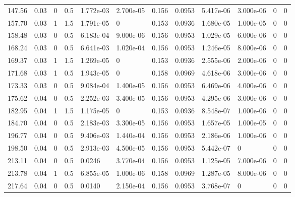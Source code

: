 \documentclass[preview]{standalone}
\begin{document}
{{\begin{tabular}{L{1.2cm}C{1.2cm} C{0.3cm}C{0.5cm} C{1.4cm}C{1.4cm} C{1.4cm}C{1.4cm} C{1.6cm}C{1.6cm} C{1.6cm}C{1.6cm}}
  147.56  &  0.03  & 0     & 0.5 &  1.772e-03  & 2.700e-05  &  0.156&   0.0953& 5.417e-06 & 3.000e-06   &  0 & 0  \\ 
  157.70  &  0.03  & 1     & 1.5 &  1.791e-05  & 0  &  0.153&   0.0936& 1.680e-05 & 1.000e-05   &  0 & 0  \\ 
  158.48  &  0.03  & 0     & 0.5 &  6.183e-04  & 9.000e-06  &  0.156&   0.0953& 1.029e-05 & 6.000e-06   &  0 & 0  \\ 
  168.24  &  0.03  & 0     & 0.5 &  6.641e-03  & 1.020e-04  &  0.156&   0.0953& 1.246e-05 & 8.000e-06   &  0 & 0  \\ 
  169.37  &  0.03  & 1     & 1.5 &  1.269e-05  & 0  &  0.153&   0.0936& 2.555e-06 & 2.000e-06   &  0 & 0  \\ 
  171.68  &  0.03  & 1     & 0.5 &  1.943e-05  & 0  &  0.158&   0.0969& 4.618e-06 & 3.000e-06   &  0 & 0  \\ 
  173.33  &  0.03  & 0     & 0.5 &  9.084e-04  & 1.400e-05  &  0.156&   0.0953& 6.469e-06 & 4.000e-06   &  0 & 0  \\ 
  175.62  &  0.04  & 0     & 0.5 &  2.252e-03  & 3.400e-05  &  0.156&   0.0953& 4.295e-06 & 3.000e-06   &  0 & 0  \\ 
  182.95  &  0.04  & 1     & 1.5 &  1.175e-05  & 0  &  0.153&   0.0936& 8.548e-07 & 1.000e-06   &  0 & 0  \\ 
  184.70  &  0.04  & 0     & 0.5 &  2.183e-03  & 3.300e-05  &  0.156&   0.0953& 1.657e-05 & 1.000e-05   &  0 & 0  \\ 
  196.77  &  0.04  & 0     & 0.5 &  9.406e-03  & 1.440e-04  &  0.156&   0.0953& 2.186e-06 & 1.000e-06   &  0 & 0  \\ 
  198.50  &  0.04  & 0     & 0.5 &  2.913e-03  & 4.500e-05  &  0.156&   0.0953& 5.442e-07 & 0   &  0 & 0  \\ 
  213.11  &  0.04  & 0     & 0.5 &  0.0246  & 3.770e-04  &  0.156&   0.0953& 1.125e-05 & 7.000e-06   &  0 & 0  \\ 
  213.78  &  0.04  & 1     & 0.5 &  6.855e-05  & 1.000e-06  &  0.158&   0.0969& 1.287e-05 & 8.000e-06   &  0 & 0  \\ 
  217.64  &  0.04  & 0     & 0.5 &  0.0140  & 2.150e-04  &  0.156&   0.0953& 3.768e-07 & 0   &  0 & 0  \\ 
\hline 
\end{tabular} 

}}
\end{document}

